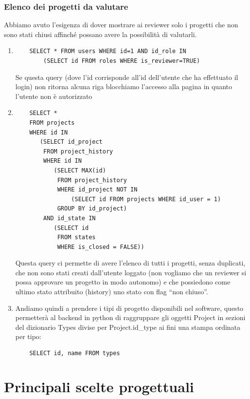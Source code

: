 \documentclass{article}
\begin{document}
\subsubsection{Elenco dei progetti da valutare}
Abbiamo avuto l'esigenza di dover mostrare ai reviewer solo i progetti che non sono stati chiusi affinché possano avere la possibilità di valutarli.
\begin{enumerate}
    \item  
    \begin{lstlisting}
    SELECT * FROM users WHERE id=1 AND id_role IN 
        (SELECT id FROM roles WHERE is_reviewer=TRUE)
    \end{lstlisting} 
    Se questa query (dove l'id corrisponde all'id dell'utente che ha effettuato il login) non ritorna alcuna riga blocchiamo l'accesso alla pagina in quanto l'utente non è autorizzato
    \item 
    \begin{lstlisting}
    SELECT *
    FROM projects
    WHERE id IN 
       (SELECT id_project
        FROM project_history
        WHERE id IN 
           (SELECT MAX(id)
            FROM project_history
            WHERE id_project NOT IN
                (SELECT id FROM projects WHERE id_user = 1)
            GROUP BY id_project)
        AND id_state IN 
           (SELECT id 
            FROM states
            WHERE is_closed = FALSE))    
    \end{lstlisting}
    Questa query ci permette di avere l'elenco di tutti i progetti, senza duplicati, che non sono stati creati dall'utente loggato (non vogliamo che un reviewer si possa approvare un progetto in modo autonomo) e che possiedono come ultimo stato attribuito (history) uno stato con flag “non chiuso”. 
    \item Andiamo quindi a prendere i tipi di progetto disponibili nel software, questo permetterà al backend in python di raggruppare gli oggetti Project in sezioni del dizionario Types divise per Project.id\_type ai fini una stampa ordinata per tipo:
    \begin{lstlisting}
    SELECT id, name FROM types
    \end{lstlisting}
\end{enumerate}


\section{Principali scelte progettuali}
\end{document}
